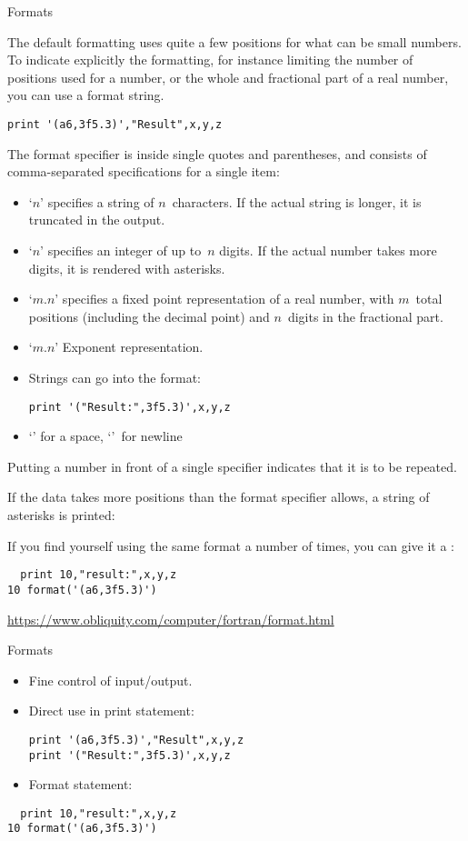  {Formats}

The default formatting uses quite a few positions for what can be
small numbers. To indicate explicitly the formatting, for instance
limiting the number of positions used for a number, or the whole and
fractional part of a real number, you can use a format string.
\begin{lstlisting}
print '(a6,3f5.3)',"Result",x,y,z
\end{lstlisting}
The format specifier is inside single quotes and parentheses, and
consists of comma-separated specifications for a single item:
\begin{itemize}
\item `$n$' specifies a string of $n$~characters. If the actual
  string is longer, it is truncated in the output.
\item `$n$' specifies an integer of up to~$n$ digits. If the actual
  number takes more digits, it is rendered with asterisks.
\item `$m.n$' specifies a fixed point representation of a real
  number, with $m$~total positions (including the decimal point)
  and $n$~digits in the fractional part.
\item `$m.n$' Exponent representation.
\item Strings can go into the format:
\begin{lstlisting}
print '("Result:",3f5.3)',x,y,z
\end{lstlisting}
\item `' for a space, `\n{/}'~for newline
\end{itemize}
Putting a number in front of a single specifier indicates that it is
to be repeated.

If the data takes more positions than the format specifier allows, a
string of asterisks is printed:
%

If you find yourself using the same format a number of times, you can
give it a :
\begin{lstlisting}
  print 10,"result:",x,y,z
10 format('(a6,3f5.3)')
\end{lstlisting}

\url{https://www.obliquity.com/computer/fortran/format.html}

\begin{slide}{Formats}
  \label{sl:formats}
  \begin{itemize}
  \item
    Fine control of input/output.
  \item
    Direct use in print statement:  
\begin{lstlisting}
print '(a6,3f5.3)',"Result",x,y,z
print '("Result:",3f5.3)',x,y,z
\end{lstlisting}
\item Format statement:
  \end{itemize}
\begin{lstlisting}
  print 10,"result:",x,y,z
10 format('(a6,3f5.3)')
\end{lstlisting}
\end{slide}

